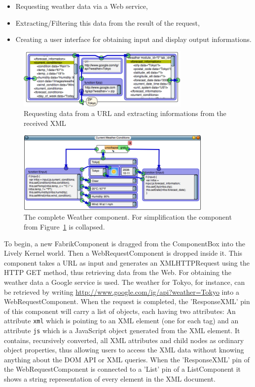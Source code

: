\documentclass[pdftex, times, 10pt, twocolumn]{article}
\begin{document}
\begin{itemize}
  \item Requesting weather data via a Web service, 
  \item Extracting/Filtering this data from the result of the request, 
  \item Creating a user interface for obtaining input and display output informations. 
\end{itemize}


\begin{figure}[t]\centering
\includegraphics[width=0.750000\textwidth]{weatherExample09.png} 

\caption{Requesting data from a URL and extracting informations from the received XML }
\label{fig:WebrequestInWeatherExample}
\end{figure}


\begin{figure}[]\centering
\includegraphics[width=0.850000\textwidth]{weatherExample07.png} 

\caption{The complete Weather component. For simplification the component from Figure~\ref{fig:WebrequestInWeatherExample} is collapsed. }
\label{fig:ExapandedSimplifiedWeatherExample}
\end{figure}
To begin, a new FabrikComponent is dragged from the ComponentBox into the Lively Kernel world. Then a WebRequestComponent is dropped inside it. This component takes a URL as input and generates an XMLHTTPRequest using the HTTP GET method, thus retrieving data from the Web. For obtaining the weather data a Google service is used. The weather for Tokyo, for instance, can be retrieved by writing \url{http://www.google.com/ig/api?weather=Tokyo} into a WebRequestComponent. When the request is completed, the 'ResponseXML' pin of this component will carry a list of objects, each having two attributes: An attribute {\tt xml} which is pointing to an XML element (one for each tag) and an attribute {\tt js} which is a JavaScript object generated from the XML element. It contains, recursively converted, all XML attributes and child nodes as ordinary object properties, thus allowing users to access the XML data without knowing anything about the DOM API or XML queries. When the 'ResponseXML' pin of the WebRequestComponent is connected to a 'List' pin of a ListComponent it shows a string representation of every element in the XML document. 
\end{document}
